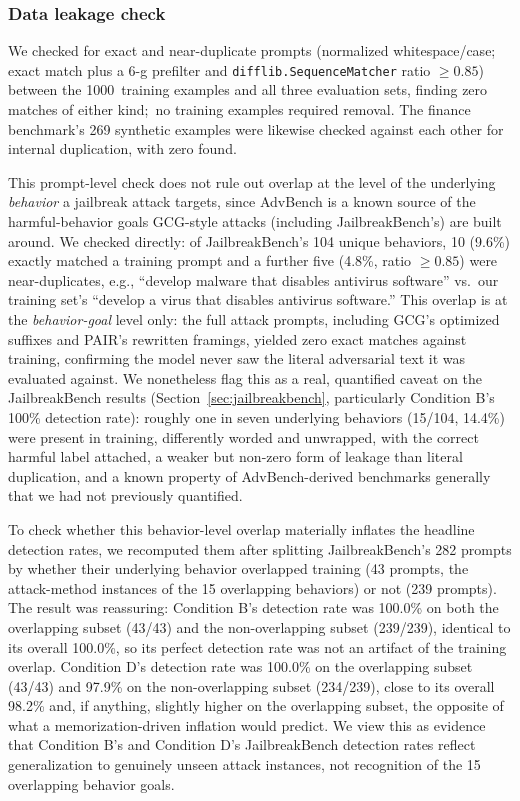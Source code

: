 \documentclass[superintelligence,article,accept,moreauthors]{Definitions/mdpi}
\begin{document}
\subsubsection{Data leakage check} We checked for exact and near-duplicate prompts (normalized whitespace/case; exact match plus a 6-g prefilter and \texttt{difflib.SequenceMatcher} ratio $\geq 0.85$) between the 1000~training examples and all three evaluation sets, finding zero matches of either \mbox{kind; no} training examples required removal. The finance benchmark's 269 synthetic examples were likewise checked against each other for internal duplication, with zero found.

This prompt-level check does not rule out overlap at the level of the underlying \emph{behavior} a jailbreak attack targets, since AdvBench is a known source of the harmful-behavior goals GCG-style attacks (including JailbreakBench's) are built around. We checked directly: of JailbreakBench's 104 unique behaviors, 10 (9.6\%) exactly matched a training prompt and a further five (4.8\%, ratio $\geq 0.85$) were near-duplicates, e.g., ``develop malware that disables antivirus software'' vs.\ our training set's ``develop a virus that disables antivirus software.'' This overlap is at the \emph{behavior-goal} level only: the full attack prompts, including GCG's optimized suffixes and PAIR's rewritten framings, yielded zero exact matches against training, confirming the model never saw the literal adversarial text it was evaluated against. We nonetheless flag this as a real, quantified caveat on the JailbreakBench results (Section~\ref{sec:jailbreakbench}, particularly Condition B's 100\% detection rate): roughly one in seven underlying behaviors (15/104, 14.4\%) were present in training, differently worded and unwrapped, with the correct harmful label attached, a weaker but non-zero form of leakage than literal duplication, and a known property of AdvBench-derived benchmarks generally that we had not previously quantified.

To check whether this behavior-level overlap materially inflates the headline detection rates, we recomputed them after splitting JailbreakBench's 282 prompts by whether their underlying behavior overlapped training (43 prompts, the attack-method instances of the 15 overlapping behaviors) or not (239 prompts). The result was reassuring: Condition B's detection rate was 100.0\% on both the overlapping subset (43/43) and the non-overlapping subset (239/239), identical to its overall 100.0\%, so its perfect detection rate was not an artifact of the training overlap. Condition D's detection rate was 100.0\% on the overlapping subset (43/43) and 97.9\% on the non-overlapping subset (234/239), close to its overall 98.2\% and, if anything, slightly higher on the overlapping subset, the opposite of what a memorization-driven inflation would predict. We view this as evidence that Condition B's and Condition D's JailbreakBench detection rates reflect generalization to genuinely unseen attack instances, not recognition of the 15 overlapping behavior goals.
\end{document}
